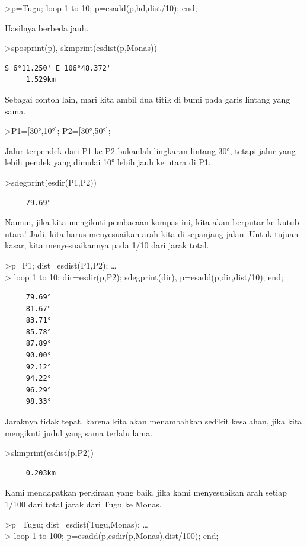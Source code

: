 \documentclass[
]{book}
\begin{document}
\textgreater p=Tugu; loop 1 to 10; p=esadd(p,hd,dist/10); end;

Hasilnya berbeda jauh.

\textgreater sposprint(p), skmprint(esdist(p,Monas))

\begin{verbatim}
S 6°11.250' E 106°48.372'
     1.529km
\end{verbatim}

Sebagai contoh lain, mari kita ambil dua titik di bumi pada garis lintang yang sama.

\textgreater P1={[}30°,10°{]}; P2={[}30°,50°{]};

Jalur terpendek dari P1 ke P2 bukanlah lingkaran lintang 30°, tetapi jalur yang lebih pendek yang dimulai 10° lebih jauh ke utara di P1.

\textgreater sdegprint(esdir(P1,P2))

\begin{verbatim}
     79.69°
\end{verbatim}

Namun, jika kita mengikuti pembacaan kompas ini, kita akan berputar ke kutub utara! Jadi, kita harus menyesuaikan arah kita di sepanjang jalan. Untuk tujuan kasar, kita menyesuaikannya pada 1/10 dari jarak total.

\textgreater p=P1; dist=esdist(P1,P2); \ldots{}\\
\textgreater{} loop 1 to 10; dir=esdir(p,P2); sdegprint(dir), p=esadd(p,dir,dist/10); end;

\begin{verbatim}
     79.69°
     81.67°
     83.71°
     85.78°
     87.89°
     90.00°
     92.12°
     94.22°
     96.29°
     98.33°
\end{verbatim}

Jaraknya tidak tepat, karena kita akan menambahkan sedikit kesalahan, jika kita mengikuti judul yang sama terlalu lama.

\textgreater skmprint(esdist(p,P2))

\begin{verbatim}
     0.203km
\end{verbatim}

Kami mendapatkan perkiraan yang baik, jika kami menyesuaikan arah setiap 1/100 dari total jarak dari Tugu ke Monas.

\textgreater p=Tugu; dist=esdist(Tugu,Monas); \ldots{}\\
\textgreater{} loop 1 to 100; p=esadd(p,esdir(p,Monas),dist/100); end;
\end{document}
